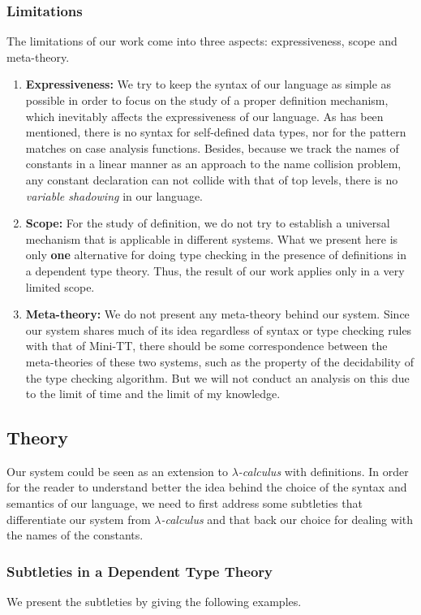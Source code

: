 \documentclass{article}
\theoremstyle{remark}
\begin{document}
\subsubsection{Limitations}
The limitations of our work come into three aspects: expressiveness, scope and meta-theory.
\begin{enumerate}
\item \textbf{Expressiveness:} We try to keep the syntax of our language as simple as possible in order to focus on the study of a proper definition mechanism, which inevitably affects the expressiveness of our language. As has been mentioned, there is no syntax for self-defined data types, nor for the pattern matches on case analysis functions. Besides, because we track the names of constants in a linear manner as an approach to the name collision problem, any constant declaration can not collide with that of top levels, there is no \emph{variable shadowing} in our language.
\item \textbf{Scope:} For the study of definition, we do not try to establish a universal mechanism that is applicable in different systems. What we present here is only \textbf{one} alternative for doing type checking in the presence of definitions in a dependent type theory. Thus, the result of our work applies only in a very limited scope.
\item \textbf{Meta-theory:} We do not present any meta-theory behind our system. Since our system shares much of its idea regardless of syntax or type checking rules with that of Mini-TT, there should be some correspondence between the meta-theories of these two systems, such as the property of the decidability of the type checking algorithm. But we will not conduct an analysis on this due to the limit of time and the limit of my knowledge. 
\end{enumerate}

\subsection{Theory}
Our system could be seen as an extension to \emph{$\lambda$-calculus} with definitions. In order for the reader to understand better the idea behind the choice of the syntax and semantics of our language, we need to first address some subtleties that differentiate our system from \emph{$\lambda$-calculus} and that back our choice for dealing with the names of the constants.

\subsubsection{Subtleties in a Dependent Type Theory}
We present the subtleties by giving the following examples. 
\end{document}
